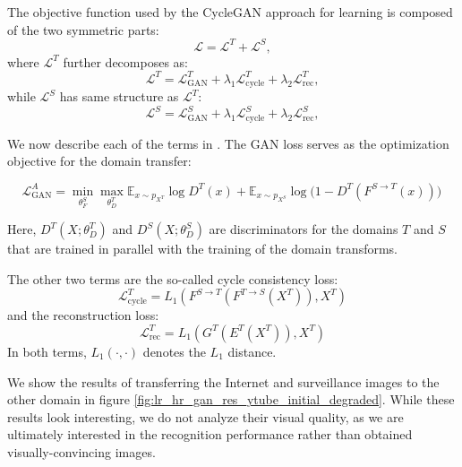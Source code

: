 The objective function used by the CycleGAN approach for learning is composed of the two symmetric parts:
\begin{equation}
\mathcal{L} = \mathcal{L}^{T} + \mathcal{L}^{S},
\end{equation} where $\mathcal{L}^{T}$ further decomposes as:
\begin{equation}\label{eq:domain_loss}
     \mathcal{L}^{T} = \mathcal{L}_{\text{GAN}}^T + \lambda_1 \mathcal{L}_{\text{cycle}}^T + \lambda_2 \mathcal{L}_{\text{rec}}^T,
\end{equation}
while $\mathcal{L}^{S}$ has same structure as $\mathcal{L}^{T}$:
\begin{equation}\label{eq:domain_loss2}
     \mathcal{L}^{S} = \mathcal{L}_{\text{GAN}}^S + \lambda_1 \mathcal{L}_{\text{cycle}}^S + \lambda_2 \mathcal{L}_{\text{rec}}^S,
\end{equation}


We now describe each of the terms in .
The GAN loss serves as the optimization objective for the domain transfer: 

\begin{dmath}
\mathcal{L}_{\text{GAN}}^A = 
    \min_{\theta^{S}_F} \max_{\theta^{T}_D} \mathbb{E}_{x \sim p_{X^{T}}} \log D^{T}(x) +
    \mathbb{E}_{x \sim p_{X^{S}}} \log \big(1 - D^{T}(F^{S \rightarrow T}(x)) \big)\,
\end{dmath}


Here, $D^{T}(X;\theta^{T}_D)$ and $D^{S}(X;\theta^{S}_D)$ are discriminators for the domains $T$ and $S$ that are trained in parallel with the training of the domain transforms.

The other two terms are the so-called cycle consistency loss: 
\begin{equation}
\mathcal{L}_{\text{cycle}}^T = L_1(F^{S \rightarrow T}(F^{T \rightarrow S}(X^{T})), X^{T})  
\end{equation}
and the reconstruction loss:
\begin{equation}
\mathcal{L}_{\text{rec}}^T = L_1(G^{T}(E^{T}(X^{T})), X^{T}) 
\end{equation}
In both terms, $L_1(\cdot,\cdot)$ denotes the $L_1$ distance.

We show the results of transferring the Internet and surveillance images to the other domain in figure \ref{fig:lr_hr_gan_res_ytube_initial_degraded}. While these results look interesting, we do not analyze their visual quality, as we are ultimately interested in the recognition performance rather than obtained visually-convincing images.

